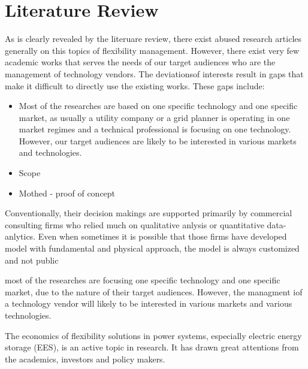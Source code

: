\chapter{Literature Review}
\label{ch:LitRev}


As is clearly revealed by the literuare review, there exist abused research articles generally on this topics of flexibility management. However, there exist very few academic works that serves the needs of our target audiences who are the management of technology vendors. The deviationsof interests result in gaps that make it difficult to directly use the existing works. These gaps include:

\begin{itemize}
	\item Most of the researches are based on one specific technology and one specific market, as usually a utility company or a grid planner is operating in one market regimes and a technical professional is focusing on one technology.  However, our target audiences are likely to be interested in various markets and technologies.
	\item Scope
	\item Mothed - proof of concept
\end{itemize}




Conventionally, their decision makings are supported primarily by commercial consulting firms who relied much on qualitative anlysis or quantitative data-anlytics. Even when sometimes it is possible that those firms have developed model with fundamental and physical approach, the model is always customized and not public 

most of the researches are focusing one specific technology and one specific market, due to the nature of their target audiences. However, the managment iof a technology vendor will likely to be interested in various markets and various technologies. 

The economics of flexibility solutions in power systems, especially electric energy storage (EES), is an active topic in research. It has drawn great attentions from the academics, investors and policy makers. 


